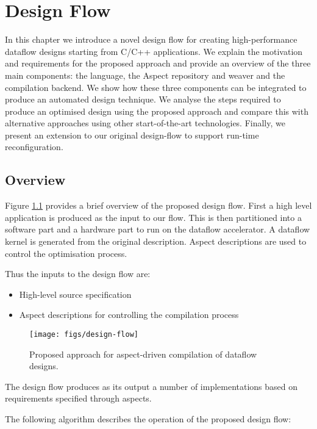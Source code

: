 \chapter{Design Flow}
\label{sec:design-flow}

In this chapter we introduce a novel design flow for creating
high-performance dataflow designs starting from C/C++ applications. We
explain the motivation and requirements for the proposed approach and
provide an overview of the three main components: the \FAST{}
language, the Aspect repository and weaver and the compilation
backend. We show how these three components can be integrated to
produce an automated design technique. We analyse the steps required
to produce an optimised design using the proposed approach and compare
this with alternative approaches using other start-of-the-art
technologies. Finally, we present an extension to our original
design-flow to support run-time reconfiguration.


\section{Overview}

Figure \ref{fig:design-flow-overview} provides a brief overview of the
proposed design flow. First a high level application is produced as
the input to our flow. This is then partitioned into a software part
and a hardware part to run on the dataflow accelerator. A dataflow
kernel is generated from the original description. Aspect descriptions
are used to control the optimisation process.

Thus the inputs to the design flow are:
\begin{itemize}
  \item High-level source specification
  \item Aspect descriptions for controlling the compilation process
\end{itemize}

\begin{figure}[!h]
  \texttt{[image: figs/design-flow]}
  \caption{Proposed approach for aspect-driven compilation of dataflow
    designs.}
  \label{fig:design-flow-overview}
\end{figure}

The design flow produces as its output a number of implementations based on
requirements specified through aspects.

The following algorithm describes the operation of the proposed design flow:

